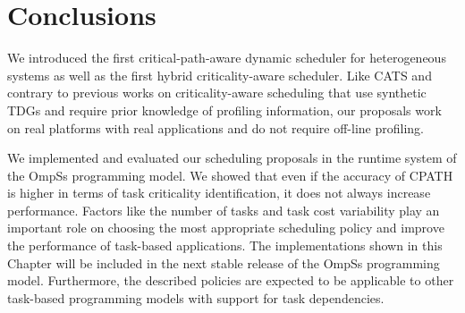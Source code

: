 
\section{Conclusions}
\label{sec.scheduling.conclusions}
We introduced the first critical-path-aware dynamic scheduler for heterogeneous systems as well as the first hybrid criticality-aware scheduler. Like CATS and contrary to previous works on criticality-aware scheduling that use synthetic TDGs and require prior knowledge of profiling information, our proposals work on real platforms with real applications and do not require off-line profiling.

We implemented and evaluated our scheduling proposals in the runtime system of the OmpSs programming model.
We showed that even if the accuracy of CPATH is higher in terms of task criticality identification, it does not always increase performance. 
Factors like the number of tasks and task cost variability play an important role on choosing the most appropriate scheduling policy and improve the performance of task-based applications.
The implementations shown in this Chapter will be included in the next stable release of the OmpSs programming model. 
Furthermore, the described policies are expected to be applicable to other task-based programming models with support for task dependencies. 

    

